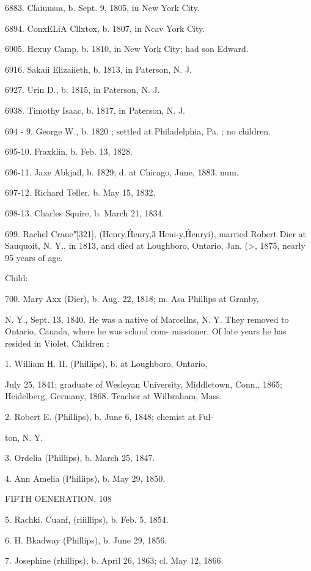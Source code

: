 \documentclass{book}
\begin{document}
6883. Claiuussa, b. Sept. 9, 1805, iu New York City. 

6894. ConxELiA Cllxtox, b. 1807, in Ncav York City. 

6905. Hexuy Camp, b. 1810, in New York City; had son Edward. 

6916. Sakaii Elizaiieth, b. 1813, in Paterson, N. J. 

6927. Urin D., b. 1815, in Paterson, N. J. 

6938. Timothy Isaac, b. 1817, in Paterson, N. J. 

694 - 9. George W., b. 1820 ; settled at Philadelphia, Pa. ; no children. 

695-10. Fraxklin, b. Feb. 13, 1828. 

696-11. Jaxe Abkjail, b. 1829; d. at Chicago, June, 1883, num. 

697-12. Richard Teller, b. May 15, 1832. 

698-13. Charles Squire, b. March 21, 1834. 

699. Rachel Crane"\^ [321], (Henry,\^ Henry,3 Heni-y,\^ 
Henryi), married Robert Dier at Sauquoit, N. Y., in 1813, and 
died at Loughboro, Ontario, Jan. (>, 1875, nearly 95 years of age. 

Child: 

700. Mary Axx (Dier), b. Aug. 22, 1818; m. Asa Phillips at Granby, 

N. Y., Sept. 13, 1840. He was a native of Marcellns, N. Y. 
They removed to Ontario, Canada, where he was school com- 
missioner. Of late years he has resided in Violet. Children : 

1. William H. II. (Phillips), b. at Loughboro, Ontario, 

July 25, 1841; graduate of Wesleyan University, 
Middletown, Conn., 1865; Heidelberg, Germany, 1868. 
Teacher at Wilbraham, Mass. 

2. Robert E. (Phillips), b. June 6, 1848; chemist at Ful- 

ton, N. Y. 

3. Ordelia (Phillips), b. March 25, 1847. 

4. Ann Amelia (Phillips), b. May 29, 1850. 



FIFTH OENERATION. 108 

5. Rachki. Cuanf, (riiillips), b. Feb. 5, 1854. 

6. H. Bkadway (Phillips), b. June 29, 1856. 

7. Josephine (rhillips), b. April 26, 1863; cl. May 12, 1866. 
\end{document}

